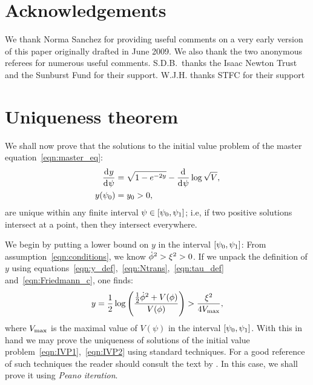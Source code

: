 \section*{Acknowledgements}
We thank Norma Sanchez for providing useful comments on a very early version of this paper originally drafted in June 2009. We also thank the two anonymous referees for numerous useful comments. S.D.B.\ thanks the Isaac Newton Trust and the Sunburst Fund for their support. W.J.H.  thanks STFC for their support




\section{Uniqueness theorem}
\label{sec:uniqueness_theorem}
We shall now prove that the solutions to the initial value problem of the master equation~\eqref{eqn:master_eq}:
%
\begin{align}
  \frac{\operatorname{d}^{}\!{y}}{\operatorname{d}^{}\!{\psi}}
  &=
  \sqrt{1-e^{-2y}} - \frac{\operatorname{d}^{}\!{}}{\operatorname{d}^{}\!{\psi}}\log \sqrt V,
  \label{eqn:IVP1}
  \\
  y(\psi_0)
  &=
  y_0>0
  \label{eqn:IVP2},
\end{align}
%
are unique within any finite interval $\psi\in[\psi_0,\psi_1]$; i.e, if two positive solutions intersect at a point, then they intersect
everywhere.

We begin by putting a lower bound on $y$ in the interval $[\psi_0,\psi_1]$: From assumption~\eqref{eqn:conditions}, we know $\dot{\phi}^2>\xi^2>0$. If we unpack the definition of $y$ using equations~\eqref{eqn:y_def},~\eqref{eqn:Ntrans},~\eqref{eqn:tau_def} and~\eqref{eqn:Friedmann_c}, one finds:
%
\begin{equation}
  y 
  = 
  \frac{1}{2}\log
  \left(\frac{\frac{1}{2}\dot{\phi}^2 + V(\phi)}{V(\phi)}\right) 
  > 
  \frac{\xi^2}{4V_\mathrm{max}},
\end{equation}
%
where $V_\mathrm{max}$ is the maximal value of $V(\psi)$ in the interval $[\psi_0,\psi_1]$. With this in hand we may prove the uniqueness of solutions of the initial value problem~\eqref{eqn:IVP1},~\eqref{eqn:IVP2} using standard techniques. For a good reference of such techniques the reader should consult the text by \citet{agarwal_1993}. In this case, we shall prove it using {\em Peano iteration}.


